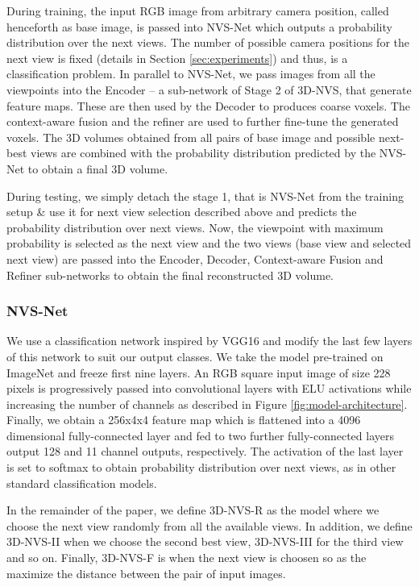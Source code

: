 During training, the input RGB image from arbitrary camera position, called henceforth as base image, is passed into NVS-Net which outputs a probability distribution over the next views. The number of possible camera positions for the next view is fixed (details in Section \ref{sec:experiments}) and thus, is a classification problem. In parallel to NVS-Net, we pass images from all the viewpoints into the Encoder -- a sub-network of Stage 2 of 3D-NVS, that generate feature maps. These are then used by the Decoder to produces coarse voxels. The context-aware fusion and the refiner \cite{pix2vox} are used to further fine-tune the generated voxels. The 3D volumes obtained from all pairs of base image and possible next-best views are combined with the probability distribution predicted by the NVS-Net to obtain a final 3D volume.

During testing, we simply detach the stage 1, that is NVS-Net from the training setup \& use it for next view selection described above and predicts the probability distribution over next views. Now, the viewpoint with maximum probability is selected as the next view and the two views (base view and selected next view) are passed into the Encoder, Decoder, Context-aware Fusion and Refiner sub-networks to obtain the final reconstructed 3D volume.
\subsubsection{NVS-Net}
We use a classification network inspired by VGG16 \cite{vgg} and modify the last few layers of this network to suit our output classes. We take the model pre-trained on ImageNet \cite{imagenet} and freeze first nine layers. An RGB square input image of size 228 pixels is progressively passed into convolutional layers with ELU activations while increasing the number of channels as described in Figure \ref{fig:model-architecture}. Finally, we obtain a 256x4x4 feature map which is flattened into a 4096 dimensional fully-connected layer and fed to two further fully-connected layers output 128 and 11 channel outputs, respectively. The activation of the last layer is set to softmax to obtain probability distribution over next views, as in other standard classification models.

In the remainder of the paper, we define 3D-NVS-R as the model where we choose the next view randomly from all the available views. In addition, we define 3D-NVS-II when we choose the second best view, 3D-NVS-III for the third view and so on. Finally, 3D-NVS-F is when the next view is choosen so as the maximize the distance between the pair of input images.
